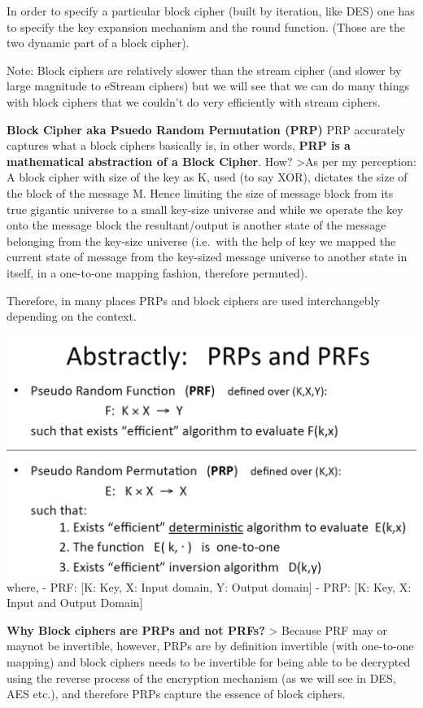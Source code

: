 \documentclass[11pt]{article}
\makeatletter
\def\maxwidth{\ifdim\Gin@nat@width>\linewidth\linewidth
    \else\Gin@nat@width\fi}
\let\Oldincludegraphics\includegraphics
\renewcommand{\includegraphics}[1]{\Oldincludegraphics[width=.8\maxwidth]{#1}}
\makeatother
\begin{document}
In order to specify a particular block cipher (built by iteration, like
DES) one has to specify the key expansion mechanism and the round
function. (Those are the two dynamic part of a block cipher).

Note: Block ciphers are relatively slower than the stream cipher (and
slower by large magnitude to eStream ciphers) but we will see that we
can do many things with block ciphers that we couldn't do very
efficiently with stream ciphers.

\textbf{Block Cipher aka Psuedo Random Permutation (PRP)} PRP accurately
captures what a block ciphers basically is, in other words, \textbf{PRP
is a mathematical abstraction of a Block Cipher}. How? \textgreater{}As
per my perception: A block cipher with size of the key as K, used (to
say XOR), dictates the size of the block of the message M. Hence
limiting the size of message block from its true gigantic universe to a
small key-size universe and while we operate the key onto the message
block the resultant/output is another state of the message belonging
from the key-size universe (i.e.~with the help of key we mapped the
current state of message from the key-sized message universe to another
state in itself, in a one-to-one mapping fashion, therefore permuted).

Therefore, in many places PRPs and block ciphers are used interchangebly
depending on the context.

\includegraphics{./Images/PRP.png} where, - PRF: {[}K: Key, X: Input
domain, Y: Output domain{]} - PRP: {[}K: Key, X: Input and Output
Domain{]}

\textbf{Why Block ciphers are PRPs and not PRFs?} \textgreater{} Because
PRF may or maynot be invertible, however, PRPs are by definition
invertible (with one-to-one mapping) and block ciphers needs to be
invertible for being able to be decrypted using the reverse process of
the encryption mechanism (as we will see in DES, AES etc.), and
therefore PRPs capture the essence of block ciphers.
\end{document}
